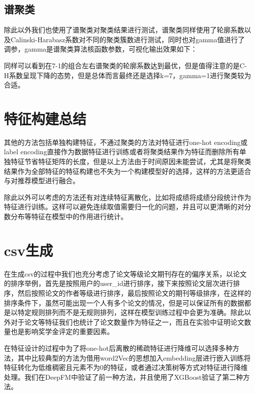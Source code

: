 \subsection{谱聚类}

除此以外我们也使用了谱聚类对聚类结果进行测试，谱聚类同样使用了轮廓系数以及Calinski-Harabasz系数对不同的聚类簇数进行测试，同时也对gamma值进行了调参，gamma是谱聚类算法核函数参数，可视化输出效果如下：



同样可以看到在7-1的组合左右谱聚类的轮廓系数达到最优，但是值得注意的是C-H系数呈现下降的态势，但是总体而言最终还是选择k=7，gamma=1进行聚类较为合适。

\section{特征构建总结}

其他的方法包括单独构建特征，不通过聚类的方法对特征进行one-hot encoding或label encoding直接作为数据特征进行训练或者将聚类结果作为特征而删除所有单独特征节省特征矩阵的长度，但是以上方法由于时间原因未能尝试，尤其是将聚类结果作为全部特征的特征构建也不失为一个构建模型好的选择，这样的方法更适合与对推荐模型进行融合。

除此以外可以考虑的方法还有对连续特征离散化，比如将成绩将成绩分段统计作为特征进行训练。这样可以避免连续取值需要归一化的问题，并且可以更清晰的对分数分布等特征在模型中的作用进行统计。

\section{csv生成}

在生成csv的过程中我们也充分考虑了论文等级论文期刊存在的偏序关系，以论文的排序举例，首先是按照用户的user\_id进行排序，接下来按照论文层次进行排序，然后按照论文的作者等级进行排序，最后按照论文的期刊等级排序，在这样的排序条件下，虽然可能出现一个人有多个论文的情况，但是可以保证所有的数据都是以特定规则排列而不是无规则排列，这样在模型训练过程中会更为准确。除此以外对于论文等特征我们也统计了论文数量作为特征之一，而且在实验中证明论文数量也是影响奖学金评定的重要因素。

在特征设计的过程中为了将one-hot后离散的稀疏特征进行降维可以选择多种方法，其中比较典型的方法为借用word2Vec的思想加入embedding层进行嵌入训练将特征转化为低维稠密且元素不为0的特征，或者通过决策树等方式对特征进行降维处理。我们在DeepFM中验证了前一种方法，并且使用了XGBoost验证了第二种方法。


